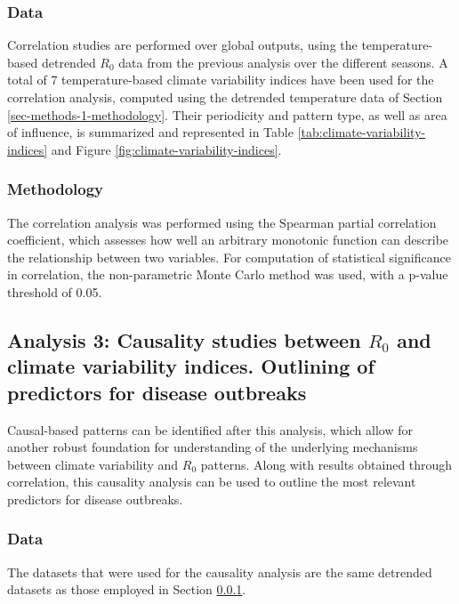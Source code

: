 \documentclass[10pt,twocolumn]{wlscirep}
\begin{document}
\subsubsection{Data} \label{sec-methods-2-data}

Correlation studies are performed over global outputs, using the temperature-based detrended $R_0$ data from the previous analysis over the different seasons. A total of 7 temperature-based climate variability indices have been used for the correlation analysis, computed using the detrended temperature data of Section \ref{sec-methods-1-methodology}. Their periodicity and pattern type, as well as area of influence, is summarized and represented in Table \ref{tab:climate-variability-indices} and Figure \ref{fig:climate-variability-indices}.


\subsubsection{Methodology} \label{sec-methods-2-methodology}

The correlation analysis was performed using the Spearman partial correlation coefficient, which assesses how well an arbitrary monotonic function can describe the relationship between two variables\cite{spearman_1904}. For computation of statistical significance in correlation, the non-parametric Monte Carlo method was used\cite{new_2000}, with a p-value threshold of 0.05.


\subsection{Analysis 3: Causality studies between $R_0$ and climate variability indices. Outlining of predictors for disease outbreaks} \label{sec-methods-3}

Causal-based patterns can be identified after this analysis, which allow for another robust foundation for understanding of the underlying mechanisms between climate variability and $R_0$ patterns. Along with results obtained through correlation, this causality analysis can be used to outline the most relevant predictors for disease outbreaks.

\subsubsection{Data} \label{sec-methods-3-data}

The datasets that were used for the causality analysis are the same detrended datasets as those employed in Section \ref{sec-methods-2-data}.
\end{document}
